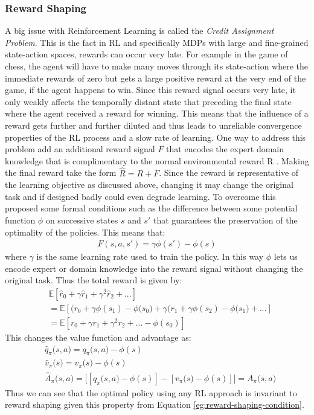 \documentclass[12pt]{extarticle}
\numberwithin{equation}{section}
\begin{document}
	\subsubsection{Reward Shaping}
	A big issue with Reinforcement Learning is called the \textit{Credit Assignment Problem}. This is the fact in RL and specifically MDPs with large and fine-grained state-action spaces, rewards can occur very late. For example in the game of chess, the agent will have to make many moves through its state-action where the immediate rewards of zero but gets a large positive reward at the very end of the game, if the agent happens to win. Since this reward signal occurs very late, it only weakly affects the temporally distant state that preceding the final state where the agent received a reward for winning. This means that the influence of a reward gets further and further diluted and thus leads to unreliable convergence properties of the RL process and a slow rate of learning.
	One way to address this problem add an additional reward signal $F$ that encodes the expert domain knowledge that is complimentary to the normal environmental reward R  \cite{mataric1994reward}. Making the final reward take the form $\hat{R} = R + F$. Since the reward is representative of the learning objective as discussed above, changing it may change the original task and if designed badly could even degrade learning. To overcome this \cite{ng1999policy} proposed some formal conditions such as the difference between some potential function $\phi$ on successive states $s$ and $s'$ that guarantees the preservation of the optimality of the policies. This means that:
	\begin{align}
	F(s,a,s') = \gamma \phi(s') - \phi(s) \label{eg:reward-shaping-condition}
	\end{align} 
	where $\gamma$ is the same learning rate used to train the policy. In this way $\phi$ lets us encode expert or domain knowledge into the reward signal without changing the original task. Thus the total reward is given by:
	\begin{align}
	&\mathbb{E}[\hat{r}_0 + \gamma \hat{r}_1 + \gamma^2\hat{r}_2 + ...] \nonumber\\
	&= \mathbb{E}[\big(r_0 + \gamma\phi(s_1) - \phi(s_0\big) + \gamma\big(r_1 + \gamma\phi(s_2) - \phi(s_1\big) + ...] \nonumber \\
	&= \mathbb{E}[r_0 + \gamma r_1 + \gamma^2 r_2 + ... - \phi(s_0)]
	\end{align}
	This changes the value function and advantage as:
	\begin{align}
	&\hat{q}_{\pi}\big(s,a\big) = q_{\pi}\big(s,a\big) - \phi(s) \nonumber\\
	&\hat{v}_{\pi}\big(s\big) = v_{\pi}\big(s\big) - \phi(s) \nonumber\\
	&\hat{A}_{\pi}\big(s,a\big) = \bigg[[q_{\pi}\big(s,a\big) - \phi(s)] - [v_{\pi}\big(s\big) - \phi(s)]\bigg] = A_{\pi}\big(s,a\big)
	\end{align}
	Thus we can see that the optimal policy using any RL approach is invariant to reward shaping given this property from Equation \ref{eg:reward-shaping-condition}.
\end{document}
